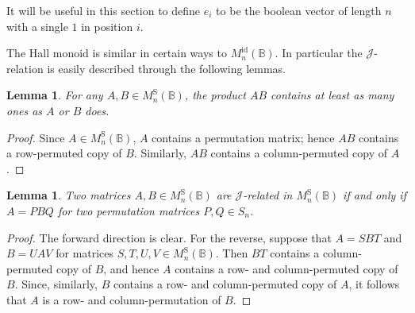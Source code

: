 \documentclass[11pt]{article}
\newtheorem{lemma}[thm]{Lemma}
\numberwithin{equation}{section}
\newcommand{\B}{\mathbb{B}}
\newcommand{\Refn}{M_n^{\text{id}}(\B)}
\newcommand{\Halln}{M_n^{\text{S}}(\B)}
\newcommand{\J}{\mathscr{J}}
\begin{document}
It will be useful in this section to define $e_i$ to be the boolean vector of
length $n$ with a single $1$ in position $i$.

The Hall monoid is similar in certain ways to $\Refn$. In particular
the $\J$-relation is easily described through the following lemmas.

\begin{lemma}
  For any $A, B \in \Halln$, the product $AB$ contains at least as many ones as
  $A$ or $B$ does.
\end{lemma}
\begin{proof}
  Since $A \in \Halln$, $A$ contains a permutation matrix; hence $AB$ contains a
  row-permuted copy of $B$. Similarly, $AB$ contains a column-permuted copy of
  $A$.
\end{proof}

\begin{lemma}
  Two matrices $A, B \in \Halln$ are $\J$-related in $\Halln$ if and only if $A
  = PBQ$ for two permutation matrices $P, Q \in S_n$.
\end{lemma}
\begin{proof}
  The forward direction is clear. For the reverse, suppose that $A = SBT$ and $B
  = UAV$ for matrices $S, T, U, V \in \Halln$. Then $BT$ contains a
  column-permuted copy of $B$, and hence $A$ contains a row- and column-permuted
  copy of $B$. Since, similarly, $B$ contains a row- and column-permuted copy of
  $A$, it follows that $A$ is a row- and column-permutation of $B$.
\end{proof}
\end{document}
